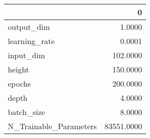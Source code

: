 \begin{tabular}{lr}
\toprule
{} &           0 \\
\midrule
output\_dim             &      1.0000 \\
learning\_rate          &      0.0001 \\
input\_dim              &    102.0000 \\
height                 &    150.0000 \\
epochs                 &    200.0000 \\
depth                  &      4.0000 \\
batch\_size             &      8.0000 \\
N\_Trainable\_Parameters &  83551.0000 \\
\bottomrule
\end{tabular}
